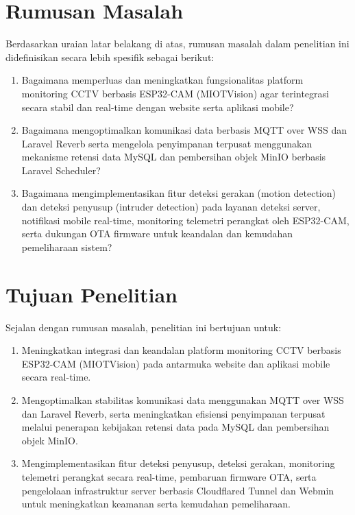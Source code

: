 \section{Rumusan Masalah}
Berdasarkan uraian latar belakang di atas, rumusan masalah dalam penelitian ini didefinisikan secara lebih spesifik sebagai berikut:
\begin{enumerate}
	\item Bagaimana memperluas dan meningkatkan fungsionalitas platform monitoring CCTV berbasis ESP32-CAM (MIOTVision) agar terintegrasi secara stabil dan real-time dengan website serta aplikasi mobile?
	\item Bagaimana mengoptimalkan komunikasi data berbasis MQTT over WSS dan Laravel Reverb serta mengelola penyimpanan terpusat menggunakan mekanisme retensi data MySQL dan pembersihan objek MinIO berbasis Laravel Scheduler?
	\item Bagaimana mengimplementasikan fitur deteksi gerakan (motion detection) dan deteksi penyusup (intruder detection) pada layanan deteksi server, notifikasi mobile real-time, monitoring telemetri perangkat oleh ESP32-CAM, serta dukungan OTA firmware untuk keandalan dan kemudahan pemeliharaan sistem?
\end{enumerate}

\section{Tujuan Penelitian}
Sejalan dengan rumusan masalah, penelitian ini bertujuan untuk:
\begin{enumerate}
	\item Meningkatkan integrasi dan keandalan platform monitoring CCTV berbasis ESP32-CAM (MIOTVision) pada antarmuka website dan aplikasi mobile secara real-time.
	\item Mengoptimalkan stabilitas komunikasi data menggunakan MQTT over WSS dan Laravel Reverb, serta meningkatkan efisiensi penyimpanan terpusat melalui penerapan kebijakan retensi data pada MySQL dan pembersihan objek MinIO.
	\item Mengimplementasikan fitur deteksi penyusup, deteksi gerakan, monitoring telemetri perangkat secara real-time, pembaruan firmware OTA, serta pengelolaan infrastruktur server berbasis Cloudflared Tunnel dan Webmin untuk meningkatkan keamanan serta kemudahan pemeliharaan.
\end{enumerate}

